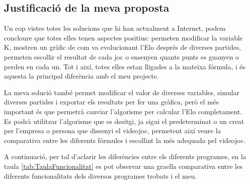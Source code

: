 \documentclass[a4paper]{article}
\begin{document}
\subsection{Justificació de la meva proposta}
Un cop vistes totes les solucions que hi han actualment a Internet, podem concloure que totes elles tenen aspectes positius: permeten modificar la variable K,  mostren un gràfic de com va evolucionant l'Elo després de diverses partides,  permeten escollir el resultat de cada joc o ensenyen quants punts es guanyen o perden en cada un. Tot i així, totes elles estan lligades a la mateixa fórmula, i és aquesta la principal diferència amb el meu projecte.

La meva solució també permet modificar el valor de diverses variables, simular diverses partides i exportar els resultats per fer una gràfica, però el més important és que permetrà canviar l'algorisme per calcular l'Elo completament. Es podrà utilitzar l'algorisme que es desitgi, ja sigui el predeterminat o un creat per l'empresa o persona que dissenyi el videojoc, permetent així veure la comparativa entre les diferents fórmules i escollint la més adequada pel videojoc. 

A continuació, per tal d'aclarir les diferències entre els diferents programes, en la taula \ref{tab:TaulaFuncionalitat} es pot observar una graella comparativa entre les diferents funcionalitats dels diversos programes trobats i el meu.
\end{document}
